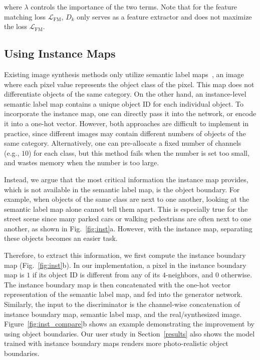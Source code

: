 where $\lambda$ controls the importance of the two terms. Note that for the feature matching loss $\mathcal{L}_{\text{FM}}$, $D_k$ only serves as a feature extractor and does not maximize the loss $\mathcal{L}_{\text{FM}}$.

\subsection{Using Instance Maps} \label{sec:alg:inst}

Existing image synthesis methods only utilize semantic label maps~\cite{isola2016image,karacan2016learning,chen2017photographic}, an image where each pixel value represents the object class of the pixel. This map does not differentiate objects of the same category. On the other hand, an instance-level semantic label map contains a unique object ID for each individual object. To incorporate the instance map, one can directly pass it into the network, or encode it into a one-hot vector. However, both approaches are difficult to implement in practice, since different images may contain different numbers of objects of the same category. Alternatively, one can pre-allocate a fixed number of channels (e.g., $10$) for each class, but this method fails when the number is set too small, and wastes memory when the number is too large.

Instead, we argue that the most critical information the instance map provides, which is not available in the semantic label map, is the object boundary. For example, when objects of the same class are next to one another, looking at the semantic label map alone cannot tell them apart. This is especially true for the street scene since many parked cars or walking pedestrians are often next to one another, as shown in Fig.~\ref{fig:inst}a. However, with the instance map, separating these objects becomes an easier task.

Therefore, to extract this information, we first compute the instance boundary map (Fig.~\ref{fig:inst}b). In our implementation, a pixel in the instance boundary map is $1$ if its object ID is different from any of its $4$-neighbors, and $0$ otherwise. The instance boundary map is then concatenated with the one-hot vector representation of the semantic label map, and fed into the generator network. Similarly, the input to the discriminator is the channel-wise concatenation of instance boundary map, semantic label map, and the real/synthesized image. Figure~\ref{fig:inst_compare}b shows an example demonstrating the improvement by using object boundaries. Our user study in Section~\ref{results} also shows the model trained with instance boundary maps renders more photo-realistic object boundaries.

